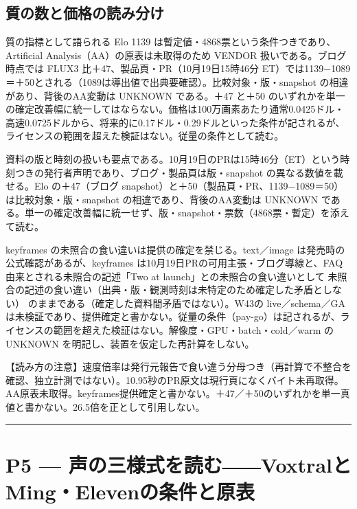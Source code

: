 \documentclass[lualatex,a4paper,10pt]{jlreq}
\begin{document}
\subsection*{質の数と価格の読み分け}


質の指標として語られる Elo 1139 は暫定値・4868票という条件つきであり、Artificial Analysis（AA）の原表は未取得のため VENDOR 扱いである。ブログ時点では FLUX3 比＋47、製品頁・PR（10月19日15時46分 ET）では1139−1089＝＋50とされる（1089は導出値で出典要確認）。比較対象・版・snapshot の相違があり、背後のAA変動は UNKNOWN である。＋47 と＋50 のいずれかを単一の確定改善幅に統一してはならない。価格は100万画素あたり通常0.0425ドル・高速0.0725ドルから、将来的に0.17ドル・0.29ドルといった条件が記されるが、ライセンスの範囲を超えた検証はない。従量の条件として読む。


資料の版と時刻の扱いも要点である。10月19日のPRは15時46分（ET）という時刻つきの発行者声明であり、ブログ・製品頁は版・snapshot の異なる数値を載せる。Elo の＋47（ブログ snapshot）と＋50（製品頁・PR、1139−1089＝50）は比較対象・版・snapshot の相違であり、背後のAA変動は UNKNOWN である。単一の確定改善幅に統一せず、版・snapshot・票数（4868票・暫定）を添えて読む。


keyframes の未照合の食い違いは提供の確定を禁じる。text／image は発売時の公式確認があるが、keyframes は10月19日PRの可用主張・ブログ導線と、FAQ由来とされる未照合の記述「Two at launch」との未照合の食い違いとして 未照合の記述の食い違い（出典・版・観測時刻は未特定のため確定した矛盾としない） のままである（確定した資料間矛盾ではない）。W43の live／schema／GA は未検証であり、提供確定と書かない。従量の条件（pay-go）は記されるが、ライセンスの範囲を超えた検証はない。解像度・GPU・batch・cold／warm の UNKNOWN を明記し、装置を仮定した再計算をしない。


\begin{tcolorbox}[colback=SurveySoft,colframe=SurveyRule,arc=1mm,boxrule=0.4pt,left=2mm,right=2mm]
【読み方の注意】速度倍率は発行元報告で食い違う分母つき（再計算で不整合を確認、独立計測ではない）。10.95秒のPR原文は現行頁になくバイト未再取得。AA原表未取得。keyframes提供確定と書かない。＋47／＋50のいずれかを単一真値と書かない。26.5倍を正として引用しない。

\end{tcolorbox}


\bigskip\hrule\bigskip


\section{P5 --- 声の三様式を読む――VoxtralとMing・Elevenの条件と原表}
\label{sec:P5}
\end{document}
